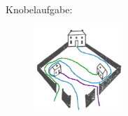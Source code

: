 Knobelaufgabe:

\begin{figure}[ht]
	\centering
	\includegraphics[width=0.3\textwidth]{../tex-snippets/ex-graph-theory-1-img-b.png}
	\label{knobel}
\end{figure}

